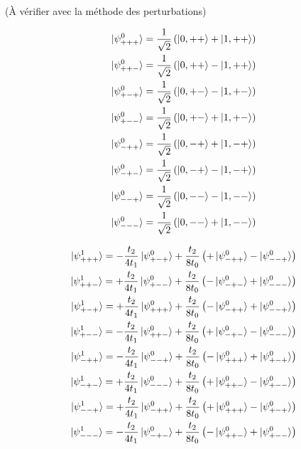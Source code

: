 \documentclass[11pt]{article}
\begin{document}
(À vérifier avec la méthode des perturbations)

\begin{align}
	\ket{\psi^0_{+++}} = \frac{1}{\sqrt{2}}\left( \ket{0,++} + \ket{1,++} \right) \\
	\ket{\psi^0_{++-}} = \frac{1}{\sqrt{2}}\left( \ket{0,++} - \ket{1,++} \right) \\
	\ket{\psi^0_{+-+}} = \frac{1}{\sqrt{2}}\left( \ket{0,+-} - \ket{1,+-} \right) \\
	\ket{\psi^0_{+--}} = \frac{1}{\sqrt{2}}\left( \ket{0,+-} + \ket{1,+-} \right) \\
	\ket{\psi^0_{-++}} = \frac{1}{\sqrt{2}}\left( \ket{0,-+} + \ket{1,-+} \right) \\
	\ket{\psi^0_{-+-}} = \frac{1}{\sqrt{2}}\left( \ket{0,-+} - \ket{1,-+} \right) \\
	\ket{\psi^0_{--+}} = \frac{1}{\sqrt{2}}\left( \ket{0,--} - \ket{1,--} \right) \\
	\ket{\psi^0_{---}} = \frac{1}{\sqrt{2}}\left( \ket{0,--} + \ket{1,--} \right)
\end{align}

\begin{align}
	\ket{\psi^1_{+++}} = -\frac{t_2}{4 t_1} \ket{\psi^0_{+-+}} + \frac{t_2}{8 t_0}\left( +\ket{\psi^0_{-++}} - \ket{\psi^0_{--+}} \right) \\
	\ket{\psi^1_{++-}} = +\frac{t_2}{4 t_1} \ket{\psi^0_{+--}} + \frac{t_2}{8 t_0} \left( -\ket{\psi^0_{-+-}} + \ket{\psi^0_{---}} \right) \\
	\ket{\psi^1_{+-+}} = +\frac{t_2}{4 t_1} \ket{\psi^0_{+++}} +  \frac{t_2}{8 t_0} \left( -\ket{\psi^0_{-++}} + \ket{\psi^0_{--+}} \right) \\
	\ket{\psi^1_{+--}} = -\frac{t_2}{4 t_1} \ket{\psi^0_{++-}} +  \frac{t_2}{8 t_0} \left( +\ket{\psi^0_{-+-}} - \ket{\psi^0_{---}} \right) \\
	\ket{\psi^1_{-++}} = -\frac{t_2}{4 t_1} \ket{\psi^0_{--+}} + \frac{t_2}{8 t_0}\left( -\ket{\psi^0_{+++}} + \ket{\psi^0_{+-+}} \right) \\
	\ket{\psi^1_{-+-}} = +\frac{t_2}{4 t_1} \ket{\psi^0_{---}} + \frac{t_2}{8 t_0}\left( +\ket{\psi^0_{++-}} - \ket{\psi^0_{+--}} \right) \\
	\ket{\psi^1_{--+}} = +\frac{t_2}{4 t_1} \ket{\psi^0_{-++}} + \frac{t_2}{8 t_0}\left( +\ket{\psi^0_{+++}} - \ket{\psi^0_{+-+}} \right) \\
	\ket{\psi^1_{---}} = -\frac{t_2}{4 t_1} \ket{\psi^0_{-+-}} + \frac{t_2}{8 t_0}\left( -\ket{\psi^0_{++-}} + \ket{\psi^0_{+--}} \right)
\end{align}
\end{document}
